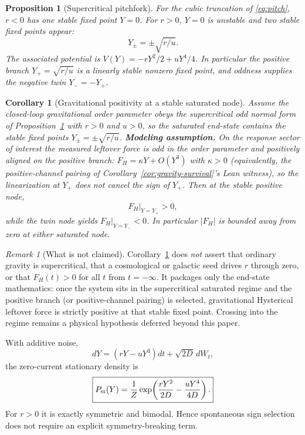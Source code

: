 \documentclass[11pt]{article}
\newtheorem{corollary}[theorem]{Corollary}
\newtheorem{proposition}[theorem]{Proposition}
\theoremstyle{definition}
\theoremstyle{remark}
\newtheorem{remark}[theorem]{Remark}
\begin{document}
\begin{proposition}[Supercritical pitchfork]\label{prop:pitchfork}
For the cubic truncation of \eqref{eq:pitch}, $r<0$ has one stable fixed point $Y=0$.  For $r>0$, $Y=0$ is unstable and two stable fixed points appear:
\begin{equation}
 \boxed{Y_\pm=\pm\sqrt{r/u}.}
\end{equation}
The associated potential is $V(Y)=-rY^2/2+uY^4/4$.
In particular the positive branch $Y_+=\sqrt{r/u}$ is a linearly stable nonzero fixed point, and oddness supplies the negative twin $Y_-=-Y_+$.
\end{proposition}

\begin{corollary}[Gravitational positivity at a stable saturated node]\label{cor:gravity-positivity}
Assume the closed-loop gravitational order parameter obeys the supercritical odd normal form of Proposition~\ref{prop:pitchfork} with $r>0$ and $u>0$, so the saturated end-state contains the stable fixed points $Y_\pm=\pm\sqrt{r/u}$.
\textbf{Modeling assumption.} On the response sector of interest the measured leftover force is odd in the order parameter and positively aligned on the positive branch: $F_H=\kappa Y+O(Y^3)$ with $\kappa>0$ (equivalently, the positive-channel pairing of Corollary~\ref{cor:gravity-survival}'s Lean witness), so the linearization at $Y_+$ does not cancel the sign of $Y_+$.
Then at the stable positive node,
\begin{equation}
 \boxed{F_H\big|_{Y=Y_+}>0,}
\end{equation}
while the twin node yields $F_H|_{Y=Y_-}<0$.  In particular $|F_H|$ is bounded away from zero at either saturated node.
\end{corollary}
\begin{remark}[What is not claimed]
Corollary~\ref{cor:gravity-positivity} does \emph{not} assert that ordinary gravity is supercritical, that a cosmological or galactic seed drives $r$ through zero, or that $F_H(t)>0$ for all $t$ from $t=-\infty$.
It packages only the end-state mathematics: once the system sits in the supercritical saturated regime and the positive branch (or positive-channel pairing) is selected, gravitational Hysterical leftover force is strictly positive at that stable fixed point.
Crossing into the regime remains a physical hypothesis deferred beyond this paper.
\end{remark}

With additive noise,
\begin{equation}
 dY=(rY-uY^3)dt+\sqrt{2D}\,dW_t,
\end{equation}
the zero-current stationary density is
\begin{equation}
 \boxed{P_{\rm st}(Y)={1\over Z}\exp\!\left({rY^2\over2D}-{uY^4\over4D}\right).}
\end{equation}
For $r>0$ it is exactly symmetric and bimodal.  Hence spontaneous sign selection does not require an explicit symmetry-breaking term.
\end{document}
